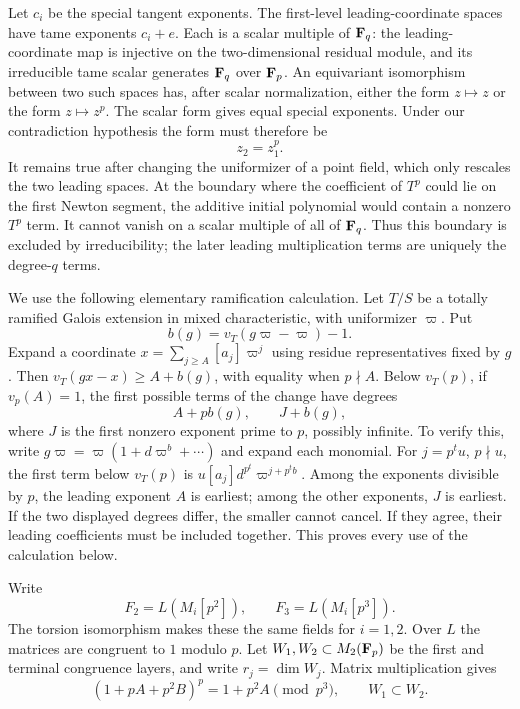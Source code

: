 Let $c_i$ be the special tangent exponents. The first-level leading-coordinate spaces have tame exponents $c_i+e$. Each is a scalar multiple of $\mathbf F_q$: the leading-coordinate map is injective on the two-dimensional residual module, and its irreducible tame scalar generates $\mathbf F_q$ over $\mathbf F_p$. An equivariant isomorphism between two such spaces has, after scalar normalization, either the form $z\mapsto z$ or the form $z\mapsto z^p$. The scalar form gives equal special exponents. Under our contradiction hypothesis the form must therefore be
\begin{equation}\label{eq:frobenius-orientation}
                                  z_2=z_1^p.
\end{equation}
It remains true after changing the uniformizer of a point field, which only rescales the two leading spaces. At the boundary where the coefficient of $T^p$ could lie on the first Newton segment, the additive initial polynomial would contain a nonzero $T^p$ term. It cannot vanish on a scalar multiple of all of $\mathbf F_q$. Thus this boundary is excluded by irreducibility; the later leading multiplication terms are uniquely the degree-$q$ terms.

We use the following elementary ramification calculation. Let $T/S$ be a totally ramified Galois extension in mixed characteristic, with uniformizer $\varpi$. Put
\[
 b(g)=v_T(g\varpi-\varpi)-1.
\]
Expand a coordinate $x=\sum_{j\ge A}[a_j]\varpi^j$ using residue representatives fixed by $g$. Then $v_T(gx-x)\ge A+b(g)$, with equality when $p\nmid A$. Below $v_T(p)$, if $v_p(A)=1$, the first possible terms of the change have degrees
\begin{equation}\label{eq:first-change}
                         A+pb(g),\qquad J+b(g),
\end{equation}
where $J$ is the first nonzero exponent prime to $p$, possibly infinite. To verify this, write $g\varpi=\varpi(1+d\varpi^b+\cdots)$ and expand each monomial. For $j=p^tu$, $p\nmid u$, the first term below $v_T(p)$ is $u[a_j]d^{p^t}\varpi^{j+p^tb}$. Among the exponents divisible by $p$, the leading exponent $A$ is earliest; among the other exponents, $J$ is earliest. If the two displayed degrees differ, the smaller cannot cancel. If they agree, their leading coefficients must be included together. This proves every use of the calculation below.

Write
\[
 F_2=L(M_i[p^2]),\qquad F_3=L(M_i[p^3]).
\]
The torsion isomorphism makes these the same fields for $i=1,2$. Over $L$ the matrices are congruent to $1$ modulo $p$. Let $W_1,W_2\subset M_2(\mathbf F_p)$ be the first and terminal congruence layers, and write $r_j=\dim W_j$. Matrix multiplication gives
\begin{equation}\label{eq:matrix-powers}
 (1+pA+p^2B)^p=1+p^2A\pmod{p^3},\qquad W_1\subset W_2.
\end{equation}

